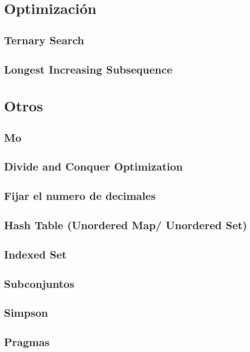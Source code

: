 \documentclass[a4paper,11pt,landscape,twocolumn]{article}
\begin{document}
\section{Optimización} %
\subsection{Ternary Search}

\subsection{Longest Increasing Subsequence}


\section{Otros} %
\subsection{Mo}

\subsection{Divide and Conquer Optimization}

\subsection{Fijar el numero de decimales}

\subsection{Hash Table (Unordered Map/ Unordered Set)}

\subsection{Indexed Set}

\subsection{Subconjuntos}

\subsection{Simpson}

\subsection{Pragmas}

\end{document}
